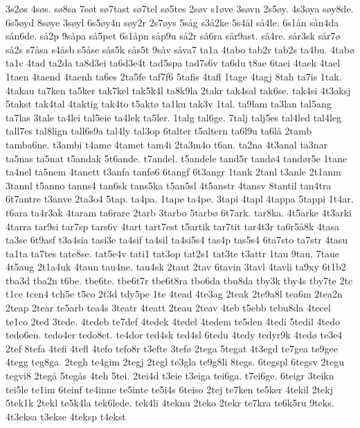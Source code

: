 {3s2^^f8s
4s^^f8s.
s^^f88sa
7s^^f8t
s^^f87tast
s^^f87tel
s^^f85tes
2s^^f8v
s1^^f8ve
3s^^f8vn
2s5^^f8y.
4s3^^f8ya
s^^f8y8de.
6s5^^f8yd
8s^^f8ye
3s^^f8yl
6s5^^f8y4n
s^^f8y2r
2s7^^f8ys
5s^^e5g
s3^^e52ke
5s4^^e5l
s^^e54le.
6s1^^e5n
s^^e5n4da
s^^e5n6de.
s^^e52p
9s^^e5pa
s^^e55pet
6s1^^e5pn
s^^e5p9u
s^^e52r
s^^e56ra
s^^e5r9ast.
s^^e54re.
s^^e5r3sk
s^^e5r7^^f8
s^^e52s
s7^^e5sa
s4^^e5sb
s5^^e5se
s^^e5s5k
s^^e5s5t
9s^^e5v
s^^e5va7
ta1a
4tabo
tab2r
tab2s
ta4bu.
4tab^^f8
ta1c
4tad
ta2da
ta8d3ei
ta6d3e4t
tad5spa
tad7s6v
ta6du
t8ae
6taei
4taek
4tael
1taen
4taend
4taenh
ta6es
2ta5fe
taf7f6
5tafis
4tafl
1tage
4tagj
8tah
ta7is
1tak.
4takau
ta7ken
ta5ker
tak7kel
tak5k4l
ta8k9la
2takr
tak4sal
tak6se.
tak4si
4t3aksj
5takst
tak4tal
4taktig
tak4to
t5akt^^f8
ta1ku
tak3v
1tal.
ta9lam
ta3lan
tal5ang
ta7las
3tale
ta4lei
tal5eie
ta4lek
ta5ler.
1talg
tal6ge.
7talj
talj5es
tal4led
tal4leg
tall7es
tal8lign
tall6s9a
tal4ly
tal3op
6talter
t5altern
ta6l9u
ta6l^^e5
2tamb
tamba6ne.
t3ambi
t4ame
4tamet
tam4i
2ta3m4o
t6an.
ta2na
4t3anal
ta3nar
ta5nas
ta5nat
t5andak
5t6ande.
t7andel.
t5andele
tand5r
tand^^f84
tand^^f8r5e
1tane
ta4nel
ta5nem
4tanett
t3anfa
tanf^^f86
6tangf
6t3angr
1tank
2tanl
t3anle
2t1anm
3tannl
t5anno
tanns4
tan6sk
tans5ka
t5an5sl
4t5anstr
4tansv
8tantil
tan4tra
6t7antre
t3anve
2ta3o4
5tap.
ta4pa.
1tape
ta4pe.
3tapi
4tapl
4tappa
5tappi
1t4ar.
t6ara
ta4r3ak
4taram
ta6rare
2tarb
3tarbo
5tarb^^f8
6t7ark.
tar8ka.
4t5arke
4t3arki
4tarra
tar9si
tar7sp
tars6v
4tart
tart7est
t5artik
tar7tit
tar4t3r
ta6r5^^e58k
4tasa
ta3se
6t9asf
t3a4sia
tasi3e
ta4sif
ta4sil
ta4si5s4
tas4p
tas5s4
6ta7sto
ta7str
4tasu
ta1ta
ta7tes
tate8se.
tat5e4v
tati1
tat3op
tat2s1
tat3te
t3attr
1tau
9tau.
7taue
4t5aug
2t1a4uk
4taun
tau4ne.
tau4sk
2taut
2tav
6tavin
3tavl
4tavli
ta9xy
6t1b2
tba3d
tba2n
t6be.
tbe6te.
tbe6t7r
tbe6t8ra
tbo6da
tbu8da
tby3k
tby4s
tby7te
2tc
t1ce
tcen4
tch5e
t5co
2t3d
tdy5pe
1te
4tead
4te3ag
2teak
2te9a8l
tea6m
2tea2n
2teap
2tear
te5arb
tea4s
3teatr
4teatt
2teau
2teav
4teb
t5ebb
tebu8da
4tecel
te1co
2ted
3tede.
4tedeb
te7def
4tedek
4tedel
4tedem
te5den
4tedi
5tedil
4tedo
tedo6en.
tedo4er
tedo8et.
te4dor
ted4sk
ted4sl
6tedu
4tedy
tedyr9k
4ted^^f8
te3e4
2tef
8tefa
4tefi
4tefl
4tefo
tefo8r
t3efte
3tef^^f8
2tega
5tegat
4t3egd
te7gea
te9gee
4tegg
teg8ga.
2tegh
te4gim
2tegj
2tegl
te3gla
te9g8li
8tegs.
6tegspl
6tegsv
2tegu
tegvi8
2teg^^e5
5teg^^e5s
4teh
5tei.
2tei4d
t3eie
t3eiga
tei6ga.
t7ei6ge.
6teigr
3teikn
tei5le
te1im
6teinf
te4inne
te5inte
te5i4s
6teiso
2tej
te7ken
te5ker
4tekil
2tekj
5tek1k
2tekl
te5k4la
tek6lede.
tek4li
4teknu
2teko
2tekr
te7kra
te6k5ru
9teks.
4t3eksa
t3ekse
4teksp
t4ekst
}
